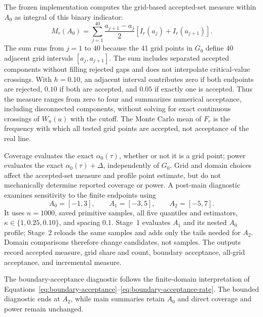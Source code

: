 The frozen implementation computes the grid-based accepted-set measure within $A_0$ as integral of this binary indicator:
\begin{equation}
  M_r(A_0)
  =\sum_{j=1}^{40}\frac{a_{j+1}-a_j}{2}
    \left[I_r(a_j)+I_r(a_{j+1})\right].
  \label{eq:accepted-measure}
\end{equation}
The sum runs from $j=1$ to $40$ because the 41 grid points in $G_0$ define 40 adjacent grid intervals $[a_j,a_{j+1}]$. The sum includes separated accepted components without filling rejected gaps and does not interpolate critical-value crossings. With $h=0.10$, an adjacent interval contributes zero if both endpoints are rejected, $0.10$ if both are accepted, and $0.05$ if exactly one is accepted. Thus the measure ranges from zero to four and summarizes numerical acceptance, including disconnected components, without solving for exact continuous crossings of $W_n(a)$ with the cutoff. The Monte Carlo mean of $F_r$ is the frequency with which all tested grid points are accepted, not acceptance of the real line.

Coverage evaluates the exact $\alpha_0(\tau)$, whether or not it is a grid point; power evaluates the exact $\alpha_0(\tau)+\Delta$, independently of $G_0$. Grid and domain choices affect the accepted-set measure and profile point estimate, but do not mechanically determine reported coverage or power. A post-main diagnostic examines sensitivity to the finite endpoints using
\begin{equation}
  A_0=[-1,3],\qquad A_1=[-3,5],\qquad A_2=[-5,7].
  \label{eq:grid-diagnostic-domains}
\end{equation}
It uses $n=1000$, saved primitive samples, all five quantiles and estimators, $\kappa\in\{1,0.25,0.10\}$, and spacing $0.1$. Stage~1 evaluates $A_1$ and its nested $A_0$ profile; Stage~2 reloads the same samples and adds only the tails needed for $A_2$. Domain comparisons therefore change candidates, not samples. The outputs record accepted measure, grid share and count, boundary acceptance, all-grid acceptance, and incremental measure.

The boundary-acceptance diagnostic follows the finite-domain interpretation of Equations~\eqref{eq:boundary-acceptance}--\eqref{eq:boundary-acceptance-rate}. The bounded diagnostic ends at $A_2$, while main summaries retain $A_0$ and direct coverage and power remain unchanged.
